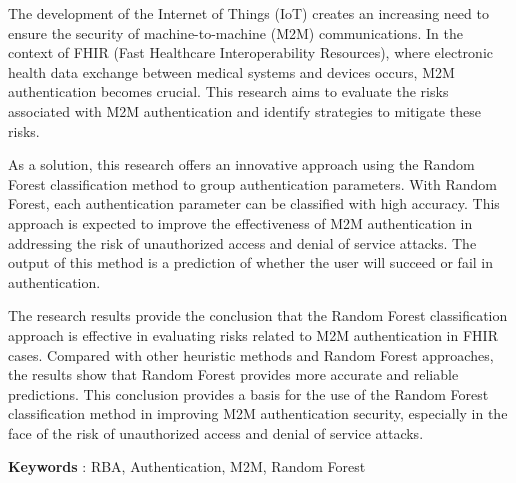 
	The development of the Internet of Things (IoT) creates an increasing need to ensure the security of machine-to-machine (M2M) communications. In the context of FHIR (Fast Healthcare Interoperability Resources), where electronic health data exchange between medical systems and devices occurs, M2M authentication becomes crucial. This research aims to evaluate the risks associated with M2M authentication and identify strategies to mitigate these risks.
	
	As a solution, this research offers an innovative approach using the Random Forest classification method to group authentication parameters. With Random Forest, each authentication parameter can be classified with high accuracy. This approach is expected to improve the effectiveness of M2M authentication in addressing the risk of unauthorized access and denial of service attacks. The output of this method is a prediction of whether the user will succeed or fail in authentication.
	
	The research results provide the conclusion that the Random Forest classification approach is effective in evaluating risks related to M2M authentication in FHIR cases. Compared with other heuristic methods and Random Forest approaches, the results show that Random Forest provides more accurate and reliable predictions. This conclusion provides a basis for the use of the Random Forest classification method in improving M2M authentication security, especially in the face of the risk of unauthorized access and denial of service attacks.

\noindent\textbf{Keywords} : RBA, Authentication, M2M, Random Forest